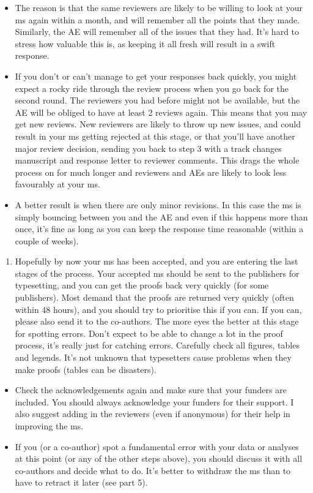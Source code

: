 \documentclass[
]{krantz}
\providecommand{\tightlist}{%
  \setlength{\itemsep}{0pt}\setlength{\parskip}{0pt}}
\begin{document}
\begin{itemize}
\tightlist
\item
  The reason is that the same reviewers are likely to be willing to look at your ms again within a month, and will remember all the points that they made. Similarly, the AE will remember all of the issues that they had. It's hard to stress how valuable this is, as keeping it all fresh will result in a swift response.
\item
  If you don't or can't manage to get your responses back quickly, you might expect a rocky ride through the review process when you go back for the second round. The reviewers you had before might not be available, but the AE will be obliged to have at least 2 reviews again. This means that you may get new reviews. New reviewers are likely to throw up new issues, and could result in your ms getting rejected at this stage, or that you'll have another major review decision, sending you back to step 3 with a track changes manuscript and response letter to reviewer comments. This drags the whole process on for much longer and reviewers and AEs are likely to look less favourably at your ms.
\item
  A better result is when there are only minor revisions. In this case the ms is simply bouncing between you and the AE and even if this happens more than once, it's fine as long as you can keep the response time reasonable (within a couple of weeks).
\end{itemize}

\begin{enumerate}
\def\labelenumi{\arabic{enumi}.}
\tightlist
\item
  Hopefully by now your ms has been accepted, and you are entering the last stages of the process. Your accepted ms should be sent to the publishers for typesetting, and you can get the proofs back very quickly (for some publishers). Most demand that the proofs are returned very quickly (often within 48 hours), and you should try to prioritise this if you can. If you can, please also send it to the co-authors. The more eyes the better at this stage for spotting errors. Don't expect to be able to change a lot in the proof process, it's really just for catching errors. Carefully check all figures, tables and legends. It's not unknown that typesetters cause problems when they make proofs (tables can be disasters).
\end{enumerate}

\begin{itemize}
\tightlist
\item
  Check the acknowledgements again and make sure that your funders are included. You should always acknowledge your funders for their support. I also suggest adding in the reviewers (even if anonymous) for their help in improving the ms.
\item
  If you (or a co-author) spot a fundamental error with your data or analyses at this point (or any of the other steps above), you should discuss it with all co-authors and decide what to do. It's better to withdraw the ms than to have to retract it later (see part 5).
\end{itemize}
\end{document}
